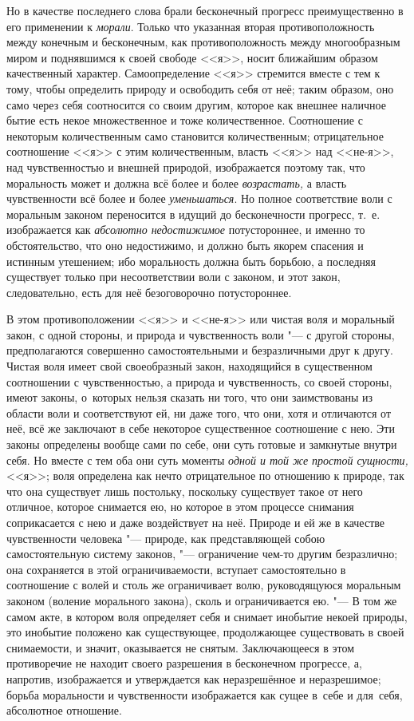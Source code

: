 Но в качестве последнего слова брали бесконечный прогресс преимущественно в его
применении к {\em морали}. Только что указанная вторая противоположность между
конечным и бесконечным, как противоположность между многообразным миром и
поднявшимся к своей свободе <<я>>, носит ближайшим образом качественный
характер. Самоопределение <<я>> стремится вместе с тем к тому, чтобы определить
природу и освободить себя от неё; таким образом, оно само через себя
соотносится со своим другим, которое как внешнее наличное бытие есть некое
множественное и тоже количественное. Соотношение с некоторым количественным
само становится количественным; отрицательное соотношение <<я>> с этим
количественным, власть <<я>> над <<не-я>>, над чувственностью и внешней
природой, изображается поэтому так, что моральность может и должна всё более и
более {\em возрастать,} а власть чувственности всё более и более
{\em уменьшаться}. Но полное соответствие воли с моральным законом переносится
в идущий до бесконечности прогресс, т.~е. изображается как
{\em абсолютно недостижимое} потустороннее, и именно то обстоятельство, что оно
недостижимо, и должно быть якорем спасения и истинным утешением; ибо
моральность должна быть борьбою, а последняя существует только при
несоответствии воли с законом, и этот закон, следовательно, есть для неё
безоговорочно потустороннее.

В этом противоположении <<я>> и <<не-я>> или чистая воля и моральный закон,
с одной стороны, и природа и чувственность воли "--- с другой стороны,
предполагаются совершенно самостоятельными и безразличными друг к другу. Чистая
воля имеет свой своеобразный закон, находящийся в существенном соотношении
с чувственностью, а природа и чувственность, со своей стороны, имеют законы,
о~которых нельзя сказать ни того, что они заимствованы из области воли и
соответствуют ей, ни даже того, что они, хотя и отличаются от неё, всё же
заключают в себе некоторое существенное соотношение с нею. Эти законы
определены вообще сами по себе, они суть готовые и замкнутые внутри себя. Но
вместе с тем оба они суть моменты {\em одной и той же простой сущности,} <<я>>;
воля определена как нечто отрицательное по отношению к природе, так что она
существует лишь постольку, поскольку существует такое от него отличное, которое
снимается ею, но которое в этом процессе снимания соприкасается с нею и даже
воздействует на неё. Природе и ей же в качестве чувственности человека "---
природе, как представляющей собою самостоятельную систему законов, "---
ограничение чем-то другим безразлично; она сохраняется в этой ограничиваемости,
вступает самостоятельно в соотношение с волей и столь же ограничивает волю,
руководящуюся моральным законом (воление морального закона), сколь и
ограничивается ею. "--- В том же самом акте, в котором воля определяет себя и
снимает инобытие некоей природы, это инобытие положено как существующее,
продолжающее существовать в своей снимаемости, и значит, оказывается не снятым.
Заключающееся в этом противоречие не находит своего разрешения в бесконечном
прогрессе, а, напротив, изображается и утверждается как неразрешённое и
неразрешимое; борьба моральности и чувственности изображается как сущее в~себе
и для~себя, абсолютное отношение.

